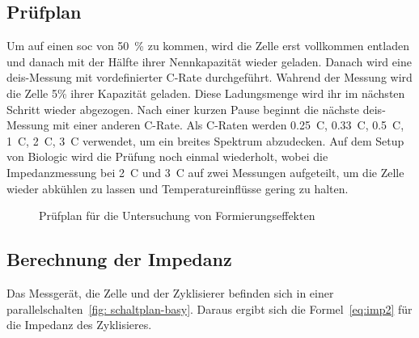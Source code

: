 \subsection{Prüfplan}
\label{subsec:pruefplan-basy}
Um auf einen \gls{soc} von \SI{50}{\%} zu kommen, wird die Zelle erst vollkommen entladen und danach mit der Hälfte
ihrer Nennkapazität wieder geladen.
Danach wird eine \gls{deis}-Messung mit vordefinierter C-Rate durchgeführt.
Wahrend der Messung wird die Zelle \si{5}{\%} ihrer Kapazität geladen.
Diese Ladungsmenge wird ihr im nächsten Schritt wieder abgezogen.
Nach einer kurzen Pause beginnt die nächste \gls{deis}-Messung mit einer anderen C-Rate.
Als C-Raten werden \SI{0.25}{C}, \SI{0.33}{C}, \SI{0.5}{C}, \SI{1}{C}, \SI{2}{C}, \SI{3}{C} verwendet, um ein
breites Spektrum abzudecken.
Auf dem Setup von Biologic wird die Prüfung noch einmal wiederholt, wobei die Impedanzmessung bei \SI{2}{C}
und \SI{3}{C} auf zwei Messungen aufgeteilt, um die Zelle wieder abkühlen zu lassen und Temperatureinflüsse gering zu halten.

\begin{figure} [h]
    \hspace{3cm}%
    \centering
    \caption{Prüfplan für die Untersuchung von Formierungseffekten}\label{fig:pruefplan}
    \label{fig:pruefplan-basy}
\end{figure}

\subsection{Berechnung der Impedanz}
Das Messgerät, die Zelle und der Zyklisierer befinden sich in einer parallelschalten~\ref{fig: schaltplan-basy}.
Daraus ergibt sich die Formel~\ref{eq:imp2} für die Impedanz des Zyklisieres.

